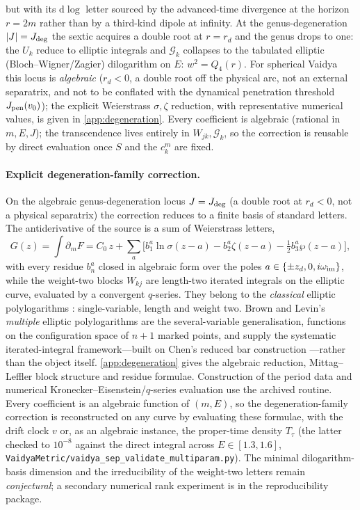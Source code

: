 \documentclass[12pt]{iopart}
\newcommand{\Jpen}{J_{\rm pen}}
\newcommand{\dd}{\mathrm{d}}
\theoremstyle{plain}
\theoremstyle{definition}
\theoremstyle{plain}
\theoremstyle{remark}
\begin{document}
but with its $\dd\log$ letter sourced by the
advanced-time divergence at the horizon $r=2m$ rather than by a third-kind dipole at
infinity. At the genus-degeneration $|J|=J_{\rm deg}$ the sextic acquires a double root at $r=r_d$
and the genus drops to one: the $U_k$ reduce to elliptic integrals and $\mathcal{G}_k$
collapses to the tabulated elliptic (Bloch--Wigner/Zagier) dilogarithm
\cite{Bloch2000,Zagier1990} on $E:\,w^2=Q_4(r)$. For spherical Vaidya this locus is
\emph{algebraic} ($r_d<0$, a double root off the physical arc, not an external
separatrix, and not to be conflated with the dynamical penetration threshold
$\Jpen(v_0)$); the explicit Weierstrass $\sigma,\zeta$ reduction, with representative
numerical values, is given in \ref{app:degeneration}. Every coefficient is algebraic
(rational in $m,E,J$); the transcendence lives entirely in $W_{jk},\mathcal{G}_k$, so the
correction is reusable by direct evaluation once $S$ and the $c_k^m$ are fixed.

\paragraph{Explicit degeneration-family correction.} On the algebraic genus-degeneration
locus $J=J_{\rm deg}$ (a double root at $r_d<0$, not a physical separatrix) the correction
reduces to a finite basis of standard letters. The antiderivative of the source is a sum
of Weierstrass letters,
\begin{equation}
    G(z)=\int\partial_m F=C_0\,z+\sum_a\Big[b_1^a\ln\sigma(z-a)-b_2^a\zeta(z-a)
        -\tfrac12 b_3^a\wp(z-a)\Big],
    \label{eq:vaidya-sep-G}
\end{equation}
with every residue $b_n^a$ closed in algebraic form over the poles
$a\in\{\pm z_d,0,i\omega_{\rm im}\}$, while the weight-two blocks $W_{kj}$ are length-two
iterated integrals on the elliptic curve, evaluated by a convergent $q$-series. They
belong to the \emph{classical} elliptic polylogarithms
\cite{BeilinsonLevin1994,Zagier1990}: single-variable, length and weight two. Brown
and Levin's \emph{multiple} elliptic polylogarithms
\cite{BrownLevin2011} are the several-variable generalisation, functions on the
configuration space of $n+1$ marked points, and supply the systematic
iterated-integral framework---built on Chen's reduced bar construction
\cite{Chen1977}---rather than the object itself. \ref{app:degeneration} gives the algebraic reduction,
Mittag--Leffler block structure and residue formulae. Construction of the period data and
numerical Kronecker--Eisenstein/$q$-series evaluation use the archived routine. Every
coefficient is an algebraic function of $(m,E)$, so
the degeneration-family correction is reconstructed on any curve by evaluating these
formulae, with the drift clock $v$ or, as an algebraic instance, the proper-time density
$T_\tau$ (the latter checked to $10^{-8}$ against the direct integral across
$E\in[1.3,1.6]$, \texttt{VaidyaMetric/vaidya\_sep\_validate\_multiparam.py}). The minimal
dilogarithm-basis dimension and the irreducibility of the weight-two letters remain
\emph{conjectural}; a secondary numerical rank experiment is in the reproducibility
package.
\end{document}
